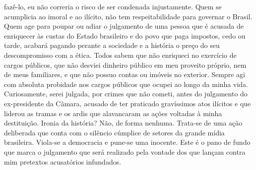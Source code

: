 fazê-lo, eu não correria o risco de ser condenada injustamente. Quem se
acumplicia ao imoral e ao ilícito, não tem respeitabilidade para
governar o Brasil. Quem age para poupar ou adiar o julgamento de uma
pessoa que é acusada de enriquecer às custas do Estado brasileiro e do
povo que paga impostos, cedo ou tarde, acabará pagando perante a
sociedade e a história o preço do seu descompromisso com a ética. Todos
sabem que não enriqueci no exercício de cargos públicos, que não desviei
dinheiro público em meu proveito próprio, nem de meus familiares, e que
não possuo contas ou imóveis no exterior. Sempre agi com absoluta
probidade nos cargos públicos que ocupei ao longo da minha vida.
Curiosamente, serei julgada, por crimes que não cometi, antes do
julgamento do ex-presidente da Câmara, acusado de ter praticado
gravíssimos atos ilícitos e que liderou as tramas e os ardis que
alavancaram as ações voltadas à minha destituição. Ironia da história?
Não, de forma nenhuma. Trata-se de uma ação deliberada que conta com o
silêncio cúmplice de setores da grande mídia brasileira. Viola-se a
democracia e pune-se uma inocente. Este é o pano de fundo que marca o
julgamento que será realizado pela vontade dos que lançam contra mim
pretextos acusatórios infundados.

